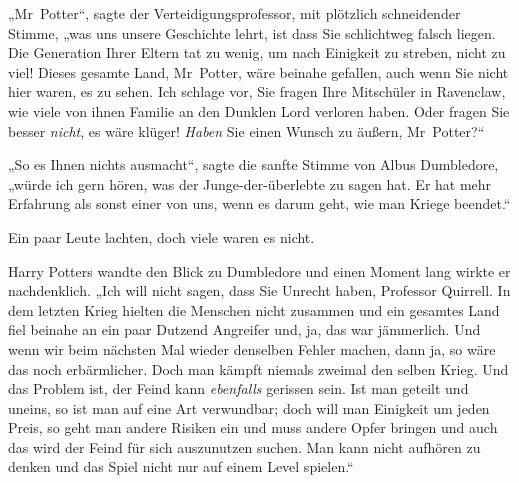 „Mr~Potter“, sagte der Verteidigungsprofessor, mit plötzlich schneidender Stimme, „was uns unsere Geschichte lehrt, ist dass Sie schlichtweg falsch liegen. Die Generation Ihrer Eltern tat zu wenig, um nach Einigkeit zu streben, nicht zu viel! Dieses gesamte Land, Mr~Potter, wäre beinahe gefallen, auch wenn Sie nicht hier waren, es zu sehen. Ich schlage vor, Sie fragen Ihre Mitschüler in Ravenclaw, wie viele von ihnen Familie an den Dunklen Lord verloren haben. Oder fragen Sie besser \emph{nicht}, es wäre klüger! \emph{Haben} Sie einen Wunsch zu äußern, Mr~Potter?“

„So es Ihnen nichts ausmacht“, sagte die sanfte Stimme von Albus Dumbledore, „würde ich gern hören, was der Junge-der-überlebte zu sagen hat. Er hat mehr Erfahrung als sonst einer von uns, wenn es darum geht, wie man Kriege beendet.“

Ein paar Leute lachten, doch viele waren es nicht.

Harry Potters wandte den Blick zu Dumbledore und einen Moment lang wirkte er nachdenklich. „Ich will nicht sagen, dass Sie Unrecht haben, Professor Quirrell. In dem letzten Krieg hielten die Menschen nicht zusammen und ein gesamtes Land fiel beinahe an ein paar Dutzend Angreifer und, ja, das war jämmerlich. Und wenn wir beim nächsten Mal wieder denselben Fehler machen, dann ja, so wäre das noch erbärmlicher. Doch man kämpft niemals zweimal den selben Krieg. Und das Problem ist, der Feind kann \emph{ebenfalls} gerissen sein. Ist man geteilt und uneins, so ist man auf eine Art verwundbar; doch will man Einigkeit um jeden Preis, so geht man andere Risiken ein und muss andere Opfer bringen und auch das wird der Feind für sich auszunutzen suchen. Man kann nicht aufhören zu denken und das Spiel nicht nur auf einem Level spielen.“

